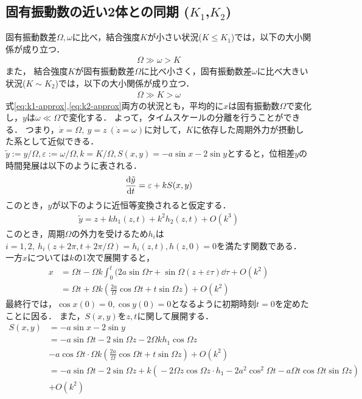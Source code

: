 \documentclass[../main]{subfiles}
\begin{document}
    \subsection{固有振動数の近い2体との同期 ($K_1$,$K_2$)}
    \label{sec:3body-k12}
    固有振動数差$\Omega,\omega$に比べ，結合強度$K$が小さい状況($K\leq K_1$)では，以下の大小関係が成り立つ．
    \begin{align}
        \label{eq:k1-approx}
        \Omega\gg\omega>K
    \end{align}
    また，
    結合強度$K$が固有振動数差$\Omega$に比べ小さく，固有振動数差$\omega$に比べ大きい状況($K\sim K_2$)では，以下の大小関係が成り立つ．
    \begin{align}
        \label{eq:k2-approx}
        \Omega\gg K>\omega
    \end{align}
    式\eqref{eq:k1-approx},\eqref{eq:k2-approx}両方の状況とも，平均的に$x$は固有振動数$\Omega$で変化し，$y$は$\omega\ll\Omega$で変化する．
    よって，タイムスケールの分離を行うことができる．
    つまり，$\dot{x}=\Omega,\ y=z\ (\dot{z}=\omega)$に対して，$K$に依存した周期外力が摂動した系として近似できる．\\
    $\tilde{y}:=y/\Omega,\varepsilon:=\omega/\Omega,k=K/\Omega,S(x,y)=-a\sin x-2\sin y$とすると，位相差$y$の時間発展は以下のように表される．
    \begin{align*}
        \dv{\tilde{y}}{t}=\varepsilon+k S(x,y) 
    \end{align*}
    このとき，$y$が以下のように近恒等変換されると仮定する．
    \begin{align}
        \tilde{y}=z+kh_1(z,t)+k^2h_2(z,t)+O(k^3)
        \label{eq:pertu-ytilde}
    \end{align}
    このとき，周期$\Omega$の外力を受けるため$h_i$は$i=1,2,\ h_i(z+2\pi,t+2\pi/\Omega)=h_i(z,t),h(z,0)=0$を満たす関数である．
    一方$x$については$k$の1次で展開すると，
    \begin{align*}
        x&=\Omega t-\Omega k\int_0^t(2a\sin \Omega\tau+\sin\Omega (z+\varepsilon\tau)\dd{\tau}+O(k^2)\\ 
        &=\Omega t+\Omega k\left(\frac{2a}{\Omega}\cos\Omega t+t\sin \Omega z\right)+O(k^2)
    \end{align*}
    最終行では，$\cos x(0)=0,\cos y(0)=0$となるように初期時刻$t=0$を定めたことに因る．
    また，$S(x,y)$を$z,t$に関して展開する．
    \begin{align*}
        S(x,y)&=-a\sin x-2\sin y\\
        &=-a\sin\Omega t-2\sin \Omega z-2\Omega kh_1\cos\Omega z\\
        &-a\cos\Omega t\cdot \Omega k\left(\frac{2a}{\Omega}\cos \Omega t+t\sin \Omega z\right)+O(k^2)\\
        &=-a\sin\Omega t-\!2\sin \Omega z       +k\left(\!-2\Omega z \cos\Omega z\cdot h_1-\!2a^2\cos^2\Omega t-\!a\Omega t\cos \Omega  t\sin \Omega z\right)\\
        &+O(k^2)
    \end{align*}
\end{document}
